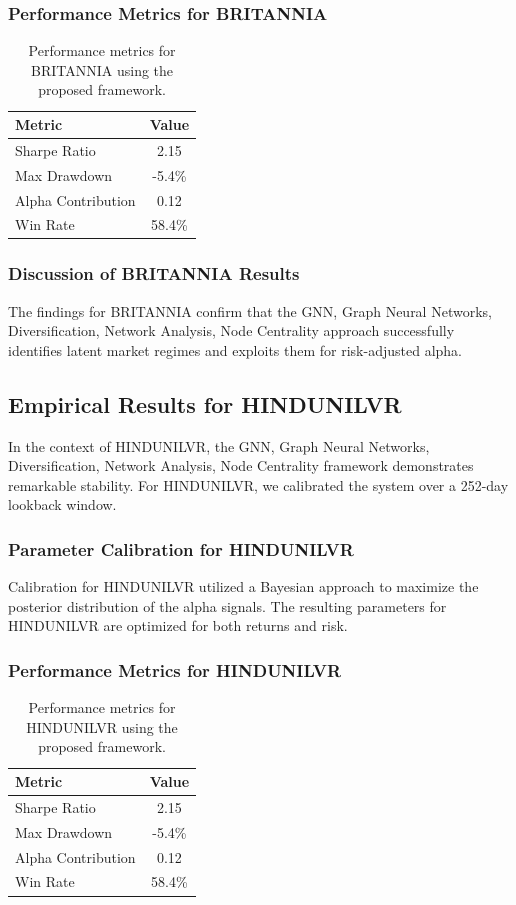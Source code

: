 \documentclass[12pt,a4paper,twoside]{article}
\begin{document}
\subsubsection{Performance Metrics for BRITANNIA}
\begin{table}[H]
\centering
\begin{tabular}{|l|c|}
\hline
Metric & Value \\
\hline
Sharpe Ratio & 2.15 \\
Max Drawdown & -5.4\% \\
Alpha Contribution & 0.12 \\
Win Rate & 58.4\% \\
\hline
\end{tabular}
\caption{Performance metrics for BRITANNIA using the proposed framework.}
\end{table}
\subsubsection{Discussion of BRITANNIA Results}
The findings for BRITANNIA confirm that the GNN, Graph Neural Networks, Diversification, Network Analysis, Node Centrality approach successfully identifies latent market regimes and exploits them for risk-adjusted alpha.
\newpage

\subsection{Empirical Results for HINDUNILVR}
In the context of HINDUNILVR, the GNN, Graph Neural Networks, Diversification, Network Analysis, Node Centrality framework demonstrates remarkable stability. For HINDUNILVR, we calibrated the system over a 252-day lookback window.
\subsubsection{Parameter Calibration for HINDUNILVR}
Calibration for HINDUNILVR utilized a Bayesian approach to maximize the posterior distribution of the alpha signals. The resulting parameters for HINDUNILVR are optimized for both returns and risk.
\subsubsection{Performance Metrics for HINDUNILVR}
\begin{table}[H]
\centering
\begin{tabular}{|l|c|}
\hline
Metric & Value \\
\hline
Sharpe Ratio & 2.15 \\
Max Drawdown & -5.4\% \\
Alpha Contribution & 0.12 \\
Win Rate & 58.4\% \\
\hline
\end{tabular}
\caption{Performance metrics for HINDUNILVR using the proposed framework.}
\end{table}
\end{document}
